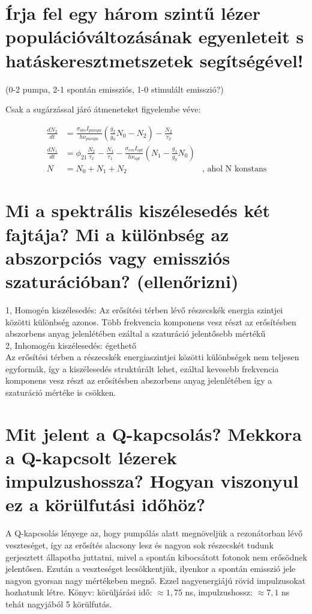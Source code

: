 \documentclass[12pt, a4paper]{article}
\begin{document}
\section{Írja fel egy három szintű lézer populációváltozásának egyenleteit s hatáskeresztmetszetek segítségével!}
(0-2 pumpa, 2-1 spontán emissziós, 1-0 stimulált emisszió?)

Csak a sugárzással járó átmeneteket figyelembe véve:
\begin{center}
\begin{align}
\frac{dN_2}{dt} &= \frac{\sigma_{abs}I_{pumpa}}{h\nu_{pumpa}} \left(\frac{g_2}{g_0}N_0-N_2\right) - \frac{N_2}{\tau_{2}}\\
\frac{dN_1}{dt} &= \phi_{21}\frac{N_2}{\tau_{2}} - \frac{N_1}{\tau_{1}} - \frac{\sigma_{em}I_{opt}}{h\nu_{opt}} \left(N_1-\frac{g_1}{g_0}N_0\right)\\
N &= N_0 + N_1 + N_2 &\text{, ahol N konstans}
\end{align}
\end{center}


\section{Mi a spektrális kiszélesedés két fajtája? Mi a különbség az abszorpciós vagy emissziós szaturációban? (ellenőrizni)}
1, Homogén kiszélesedés: Az erősítési térben lévő részecskék energia szintjei közötti különbség azonos. Több frekvencia komponens vesz részt az erősítésben abszorbens anyag jelenlétében ezáltal a szaturáció jelentősebb mértékű\\
2, Inhomogén kiszélesedés: égethető\\
Az erősítési térben a részecskék energiaszintjei közötti különbségek nem teljesen egyformák, így a kiszélesedés struktúrált lehet, ezáltal kevesebb frekvencia komponens vesz részt az erősítésben abszorbens anyag jelenlétében így a szaturáció mértéke is csökken.

\section{Mit jelent a Q-kapcsolás? Mekkora a Q-kapcsolt lézerek impulzushossza? Hogyan viszonyul ez a körülfutási időhöz?}
A Q-kapcsolás lényege az, hogy pumpálás alatt megnöveljük a rezonátorban lévő veszteséget, így az erősítés alacsony lesz és nagyon sok részecskét tudunk gerjesztett állapotba juttatni, mivel a spontán kibocsátott fotonok nem erősödnek jelentősen. Ezután a veszteséget lecsökkentjük, ilyenkor a spontán emisszió jele nagyon gyorsan nagy mértékeben megnő. Ezzel nagyenergiájú rövid impulzusokat hozhatunk létre. Könyv: körüljárási idő: $\approx 1,75$ ns, impulzushossz: $\approx 7,1$ ns tehát nagyjából 5 körülfutás.
\end{document}
